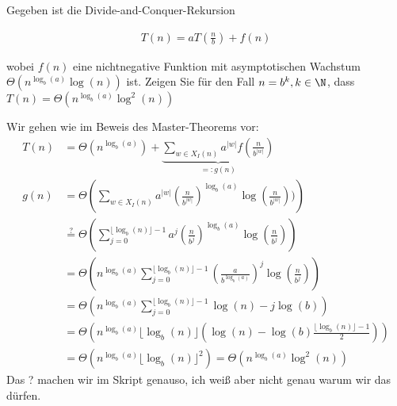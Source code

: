 
\begin{exercise}

Gegeben ist die Divide-and-Conquer-Rekursion

\begin{align*}
  T(n) = aT\left(\frac{n}{b}\right) + f(n)
\end{align*}

wobei $f(n)$ eine nichtnegative Funktion mit asymptotischen Wachstum $\Theta(n^{\log_b(a)}\log (n))$ ist. Zeigen Sie für den Fall $n = b^k, k \in \N$, dass $T(n) = \Theta(n^{\log_b(a)}\log^2 (n))$

\end{exercise}


\begin{solution}
Wir gehen wie im Beweis des Master-Theorems vor:
\begin{align*}
  T(n) &= \Theta\left(n^{\log_b(a)}\right) +
  \underbrace{\sum_{w \in X_I(n)}a^{|w|}f\left(\frac{n}{b^{|w|}}\right)}_{=: g(n)} \\
  g(n) &= \Theta\left(\sum_{w \in X_I(n)}a^{|w|}
  \left(\frac{n}{b^{|w|}}\right)^{\log_b(a)}\log \left(\frac{n}{b^{|w|}}\right))\right) \\
  &\stackrel{?}{=} \Theta\left(\sum_{j = 0}^{\lfloor \log_b(n) \rfloor -1}a^{j}
  \left(\frac{n}{b^{j}}\right)^{\log_b(a)}\log \left(\frac{n}{b^{j}}\right)\right) \\
  &= \Theta\left(n^{\log_b(a)}\sum_{j = 0}^{\lfloor \log_b(n) \rfloor -1}
  \left(\frac{a}{b^{\log_b(a)}}\right)^j \log \left(\frac{n}{b^{j}}\right)\right) \\
  &= \Theta\left(n^{\log_b(a)}\sum_{j = 0}^{\lfloor \log_b(n) \rfloor -1}
  \log(n) - j\log(b)\right) \\
  &= \Theta\left(n^{\log_b(a)}\lfloor \log_b(n) \rfloor\left(\log(n) -
  \log(b)\frac{\lfloor \log_b(n) \rfloor -1}{2}\right)\right) \\
  &= \Theta\left(n^{\log_b(a)}\lfloor \log_b(n) \rfloor^2\right)
  =  \Theta\left(n^{\log_b(a)}\log^2(n)\right)
\end{align*}
Das ? machen wir im Skript genauso, ich weiß aber nicht genau warum wir das dürfen.
\end{solution}


